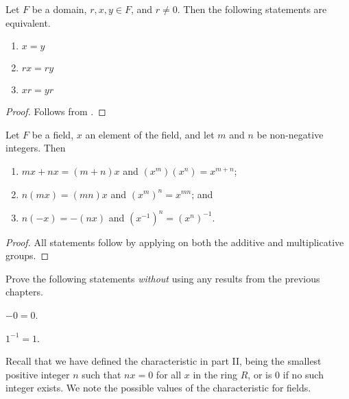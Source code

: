 \begin{proposition}
    Let $F$ be a domain, $r, x, y \in F$, and $r \neq 0$. Then the following statements are equivalent.
    \begin{enumerate}[label=(\arabic*)]
        \item $x = y$
        \item $rx = ry$
        \item $xr = yr$
    \end{enumerate}
\end{proposition}
\begin{proof}
    Follows from .
\end{proof}

\newpage

\begin{proposition}
    Let $F$ be a field, $x$ an element of the field, and let $m$ and $n$ be non-negative integers. Then
    \begin{enumerate}
        \item $mx + nx = (m+n)x$ and $(x^m)(x^n) = x^{m+n}$;
        \item $n(mx) = (mn)x$ and $(x^m)^n = x^{mn}$; and
        \item $n(-x) = -(nx)$ and $(x^{-1})^n = (x^n)^{-1}$.
    \end{enumerate}
\end{proposition}
\begin{proof}
    All statements follow by applying  on both the additive and multiplicative groups.
\end{proof}

\begin{exercise}\label{exercise-inverse-of-additive-and-multiplicative-identities-are-themselves}
    Prove the following statements \textit{without} using any results from the previous chapters.
    \begin{partquestions}{\alph*}
        \item $-0 = 0$.
        \item $1^{-1} = 1$.
    \end{partquestions}
\end{exercise}

Recall that we have defined the characteristic in part II, being the smallest positive integer $n$ such that $nx = 0$ for all $x$ in the ring $R$, or is 0 if no such integer exists. We note the possible values of the characteristic for fields.

